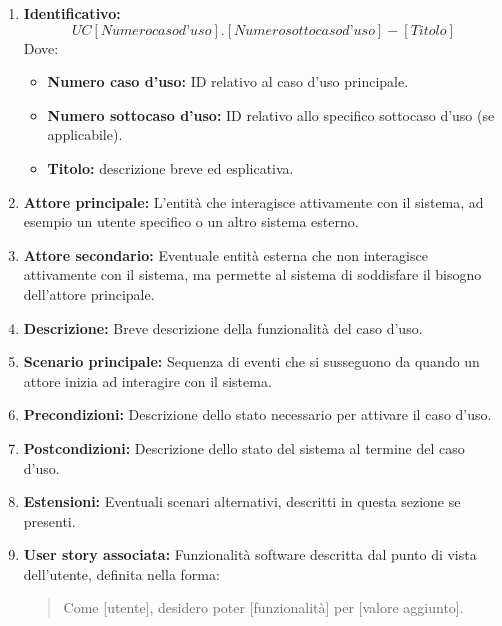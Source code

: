 \begin{enumerate}
    \item \textbf{Identificativo:} 
    \[
    UC [Numero caso d’uso] . [Numero sottocaso d’uso] - [Titolo]
    \]
    \medskip Dove:
    \begin{itemize}
        \item \textbf{Numero caso d’uso:} ID relativo al caso d'uso principale.
        \item \textbf{Numero sottocaso d’uso:} ID relativo allo specifico sottocaso d'uso (se applicabile).
        \item \textbf{Titolo:} descrizione breve ed esplicativa.
    \end{itemize}

    \item \textbf{Attore principale:} L'entità che interagisce attivamente con il sistema, ad esempio un utente specifico o un altro sistema esterno.

    \item \textbf{Attore secondario:} Eventuale entità esterna che non interagisce attivamente con il sistema, ma permette al sistema di soddisfare il bisogno dell’attore principale.

    \item \textbf{Descrizione:} Breve descrizione della funzionalità del caso d’uso.

    \item \textbf{Scenario principale:} Sequenza di eventi che si susseguono da quando un attore inizia ad interagire con il sistema.

    \item \textbf{Precondizioni:} Descrizione dello stato necessario per attivare il caso d’uso.

    \item \textbf{Postcondizioni:} Descrizione dello stato del sistema al termine del caso d’uso.

    \item \textbf{Estensioni:} Eventuali scenari alternativi, descritti in questa sezione se presenti.

    \item \textbf{User story associata:} Funzionalità software descritta dal punto di vista dell'utente, definita nella forma:
    \begin{quote}
        Come [utente], desidero poter [funzionalità] per [valore aggiunto].
    \end{quote}
\end{enumerate}


